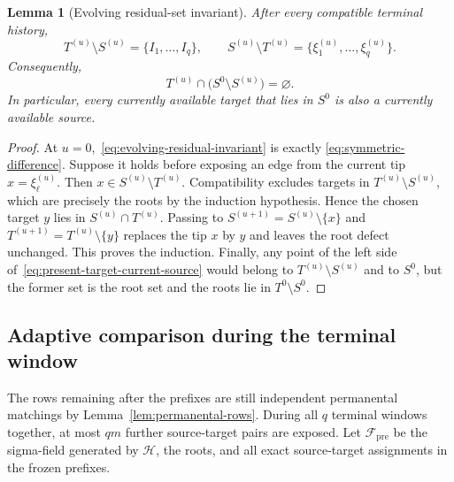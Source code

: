 \documentclass[11pt]{article}
\newcommand{\1}{\mathbf 1}
\newcommand{\cF}{\mathcal F}
\newcommand{\cH}{\mathcal H}
\newtheorem{lemma}[theorem]{Lemma}
\theoremstyle{definition}
\theoremstyle{remark}
\begin{document}
\begin{lemma}[Evolving residual-set invariant]
\label{lem:evolving-residual-invariant}
After every compatible terminal history,
\begin{equation}\label{eq:evolving-residual-invariant}
  T^{(u)}\setminus S^{(u)}=\{I_1,\dots,I_q\},
  \qquad
  S^{(u)}\setminus T^{(u)}
  =\{\xi_1^{(u)},\dots,\xi_q^{(u)}\}.
\end{equation}
Consequently,
\begin{equation}\label{eq:present-target-current-source}
  T^{(u)}\cap\bigl(S^0\setminus S^{(u)}\bigr)=\varnothing.
\end{equation}
In particular, every currently available target that lies in $S^0$ is
also a currently available source.
\end{lemma}

\begin{proof}
At $u=0$,~\eqref{eq:evolving-residual-invariant} is exactly
\eqref{eq:symmetric-difference}.  Suppose it holds before exposing an
edge from the current tip $x=\xi_\ell^{(u)}$.  Then
$x\in S^{(u)}\setminus T^{(u)}$.  Compatibility excludes targets in
$T^{(u)}\setminus S^{(u)}$, which are precisely the roots by the
induction hypothesis.  Hence the chosen target $y$ lies in
$S^{(u)}\cap T^{(u)}$.  Passing to
$S^{(u+1)}=S^{(u)}\setminus\{x\}$ and
$T^{(u+1)}=T^{(u)}\setminus\{y\}$ replaces the tip $x$ by $y$ and leaves
the root defect unchanged.  This proves the induction.  Finally, any
point of the left side of~\eqref{eq:present-target-current-source} would
belong to $T^{(u)}\setminus S^{(u)}$ and to $S^0$, but the former set is
the root set and the roots lie in $T^0\setminus S^0$.
\end{proof}

\subsection{Adaptive comparison during the terminal window}

The rows remaining after the prefixes are still independent permanental
matchings by Lemma~\ref{lem:permanental-rows}.  During all $q$ terminal
windows together, at most $qm$ further source-target pairs are exposed.
Let $\cF_{\mathrm{pre}}$ be the sigma-field generated by $\cH$, the
roots, and all exact source-target assignments in the frozen prefixes.
\end{document}
